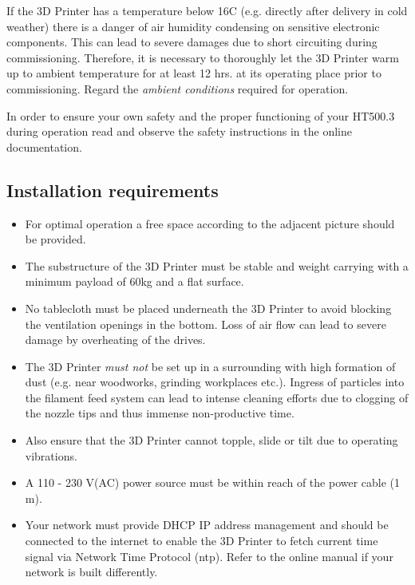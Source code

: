 \begin{notice}
  If the 3D Printer has a temperature below 16\degree C (e.g. directly after delivery in cold weather) there is a danger of air humidity condensing on sensitive electronic components. This can lead to severe damages due to short circuiting during commissioning.
  Therefore, it is necessary to thoroughly let the 3D Printer warm up to ambient temperature for at least 12 hrs. at its operating place prior to commissioning.
  Regard the \emph{ambient conditions} required for operation. 
\end{notice}

\begin{notice}
  In order to ensure your own safety and the proper functioning of your HT500.3 during operation read and observe the safety instructions in the online documentation. 
\end{notice}


\subsection*{Installation requirements}

\begin{itemize}
  \item For optimal operation a free space according to the adjacent picture should 
        be provided.
  \item The substructure of the 3D Printer must be stable and weight carrying with a 
        minimum payload of 60kg and a flat surface.
  \item No tablecloth must be placed underneath the 3D Printer to avoid blocking the 
        ventilation openings in the bottom. Loss of air flow can lead to severe damage by overheating of the drives.
  \item The 3D Printer \emph{must not} be set up in a surrounding with high 
        formation of dust (e.g. near woodworks, grinding workplaces etc.). Ingress of particles into the filament feed system can lead to intense cleaning efforts due to clogging of the nozzle tips and thus immense non-productive time.
  \item Also ensure that the 3D Printer cannot topple, slide or tilt due to 
        operating vibrations.
  \item A 110 - 230 V(AC) power source must be within reach of the power cable (1 m).
  \item Your network must provide DHCP IP address management and should be connected 
        to the internet to enable the 3D Printer to fetch current time signal via Network Time Protocol (ntp).
        Refer to the online manual if your network is built differently.
\end{itemize}

